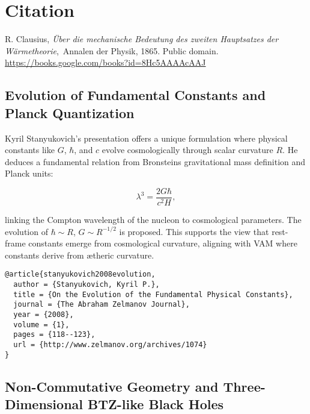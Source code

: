 \section*{Citation}
\begingroup
\renewcommand{\section}[2]{}%
\begin{thebibliography}{9}

R. Clausius, \textit{\"Uber die mechanische Bedeutung des zweiten Hauptsatzes der W\"armetheorie},\ Annalen der Physik, 1865. Public domain. \\ \url{https://books.google.com/books?id=8Hc5AAAAcAAJ}

\end{thebibliography}
\endgroup


\subsection{Evolution of Fundamental Constants and Planck Quantization}

Kyril Stanyukovich's presentation \cite{stanyukovich2008evolution} offers a unique formulation where physical constants like $G$, $\hbar$, and $c$ evolve cosmologically through scalar curvature $R$. He deduces a fundamental relation from Bronstein\rqs s gravitational mass definition and Planck units:

\begin{equation}
\lambda^3 = \frac{2G\hbar}{c^2 H},
\end{equation}

linking the Compton wavelength of the nucleon to cosmological parameters. The evolution of $\hbar \sim R$, $G \sim R^{-1/2}$ is proposed. This supports the view that rest-frame constants emerge from cosmological curvature, aligning with VAM where constants derive from ætheric curvature.

\begin{verbatim}
@article{stanyukovich2008evolution,
  author = {Stanyukovich, Kyril P.},
  title = {On the Evolution of the Fundamental Physical Constants},
  journal = {The Abraham Zelmanov Journal},
  year = {2008},
  volume = {1},
  pages = {118--123},
  url = {http://www.zelmanov.org/archives/1074}
}
\end{verbatim}

\subsection{Non-Commutative Geometry and Three-Dimensional BTZ-like Black Holes}

